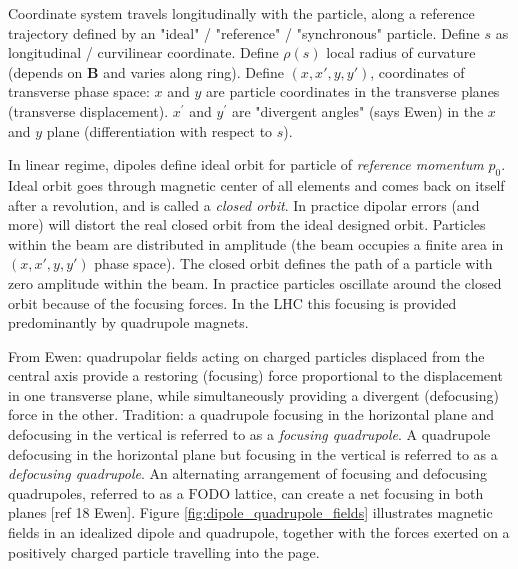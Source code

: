 Coordinate system travels longitudinally with the particle, along a reference trajectory defined by an "ideal" / "reference" / "synchronous" particle.
Define $s$ as longitudinal / curvilinear coordinate.
Define $\rho(s)$ local radius of curvature (depends on $\mathbf{B}$ and varies along ring).
Define $(x, x\prime, y, y\prime)$, coordinates of transverse phase space:
$x$ and $y$ are particle coordinates in the transverse planes (transverse displacement).
$x^{'}$ and $y^{'}$ are "divergent angles" (says Ewen) in the $x$ and $y$ plane (differentiation with respect to $s$).
\bigbreak

In linear regime, dipoles define ideal orbit for particle of \emph{reference momentum} $p_0$.
Ideal orbit goes through magnetic center of all elements and comes back on itself after a revolution, and is called a \emph{closed orbit}.
In practice dipolar errors (and more) will distort the real closed orbit from the ideal designed orbit.
Particles within the beam are distributed in amplitude (the beam occupies a finite area in $(x, x\prime, y, y\prime)$ phase space). 
The closed orbit defines the path of a particle with zero amplitude within the beam.
In practice particles oscillate around the closed orbit because of the focusing forces. 
In the LHC this focusing is provided predominantly by quadrupole magnets.
\bigbreak

From Ewen: quadrupolar fields acting on charged particles displaced from the central axis provide a restoring (focusing) force proportional to the displacement in one transverse plane, while simultaneously providing a divergent (defocusing) force in the other. 
Tradition: a quadrupole focusing in the horizontal plane and defocusing in the vertical is referred to as a \emph{focusing quadrupole}. 
A quadrupole defocusing in the horizontal plane but focusing in the vertical is referred to as a \emph{defocusing quadrupole}.
An alternating arrangement of focusing and defocusing quadrupoles, referred to as a $\mathrm{FODO}$ lattice, can create a net focusing in both planes [ref 18 Ewen]. 
Figure \ref{fig:dipole_quadrupole_fields} illustrates magnetic fields in an idealized dipole and quadrupole, together with the forces exerted on a positively charged particle travelling into the page.
\bigbreak

